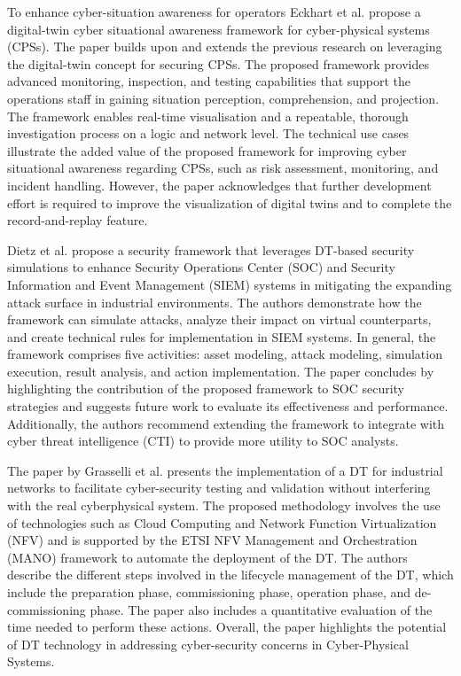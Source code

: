 To enhance cyber-situation awareness for operators Eckhart et al.\cite{eckhartEnhancingCyberSituational2019} propose a digital-twin cyber situational awareness framework for cyber-physical systems (CPSs). The paper builds upon and extends the previous research on leveraging the digital-twin concept for securing CPSs. The proposed framework provides advanced monitoring, inspection, and testing capabilities that support the operations staff in gaining situation perception, comprehension, and projection. The framework enables real-time visualisation and a repeatable, thorough investigation process on a logic and network level. The technical use cases illustrate the added value of the proposed framework for improving cyber situational awareness regarding CPSs, such as risk assessment, monitoring, and incident handling. However, the paper acknowledges that further development effort is required to improve the visualization of digital twins and to complete the record-and-replay feature. 


Dietz et al.\cite{dietzIntegratingDigitalTwin2020} propose a security framework that leverages DT-based security simulations to enhance Security Operations Center (SOC) and Security Information and Event Management (SIEM) systems in mitigating the expanding attack surface in industrial environments. The authors demonstrate how the framework can simulate attacks, analyze their impact on virtual counterparts, and create technical rules for implementation in SIEM systems. In general, the framework comprises five activities: asset modeling, attack modeling, simulation execution, result analysis, and action implementation. The paper concludes by highlighting the contribution of the proposed framework  to SOC security strategies and suggests future work to evaluate its effectiveness and performance. Additionally, the authors recommend extending the framework to integrate with cyber threat intelligence (CTI) to provide more utility to SOC analysts.

The paper by Grasselli et al.\cite{grasselliIndustrialNetworkDigital2022} presents the implementation of a DT for industrial networks to facilitate cyber-security testing and validation without interfering with the real cyberphysical system. The proposed methodology involves the use of technologies such as Cloud Computing and Network Function Virtualization (NFV) and is supported by the ETSI NFV Management and Orchestration (MANO) framework to automate the deployment of the DT. The authors describe the different steps involved in the lifecycle management of the DT, which include the preparation phase, commissioning phase, operation phase, and de-commissioning phase. The paper also includes a quantitative evaluation of the time needed to perform these actions. Overall, the paper highlights the potential of DT technology in addressing cyber-security concerns in Cyber-Physical Systems.


